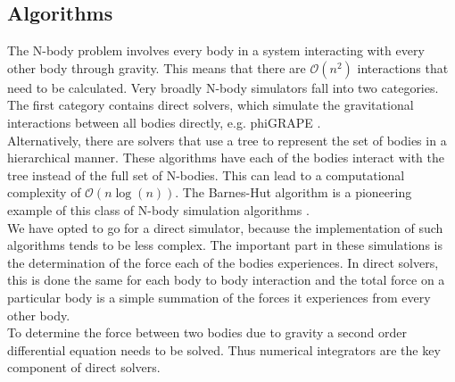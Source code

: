 \documentclass[11pt]{article} %
\begin{document}
\subsection{Algorithms}
The N-body problem involves every body in a system interacting with every other body through gravity. This means that there are $\mathcal{O}(n^2)$ interactions that need to be calculated. Very broadly N-body simulators fall into two categories. The first category contains direct solvers, which simulate the gravitational interactions between all bodies directly, e.g. phiGRAPE \cite{Harfst2007357}. \\
Alternatively, there are solvers that use a tree to represent the set of bodies in a hierarchical manner. These algorithms have each of the bodies interact with the tree instead of the full set of N-bodies. This can lead to a computational complexity of $\mathcal{O}(n \log(n))$. The Barnes-Hut algorithm is a pioneering example of this class of N-body simulation algorithms \cite{barnes1986hierarchical}.\\
We have opted to go for a direct simulator, because the implementation of such algorithms tends to be less complex. The important part in these simulations is the determination of the force each of the bodies experiences. In direct solvers, this is done the same for each body to body interaction and the total force on a particular body is a simple summation of the forces it experiences from every other body. \\
To determine the force between two bodies due to gravity a second order differential equation needs to be solved. Thus numerical integrators are the key component of direct solvers.
\end{document}
